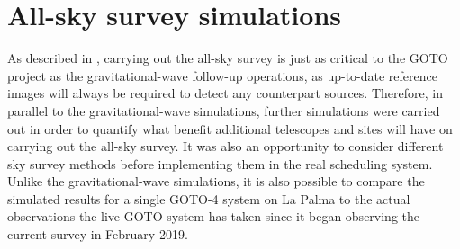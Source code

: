 
\section{All-sky survey simulations}
\label{sec:survey_sims}


\begin{colsection}

As described in , carrying out the all-sky survey is just as critical to the GOTO project as the gravitational-wave follow-up operations, as up-to-date reference images will always be required to detect any counterpart sources. Therefore, in parallel to the gravitational-wave simulations, further simulations were carried out in order to quantify what benefit additional telescopes and sites will have on carrying out the all-sky survey. It was also an opportunity to consider different sky survey methods before implementing them in the real scheduling system. Unlike the gravitational-wave simulations, it is also possible to compare the simulated results for a single GOTO-4 system on La Palma to the actual observations the live GOTO system has taken since it began observing the current survey in February 2019.

\end{colsection}


